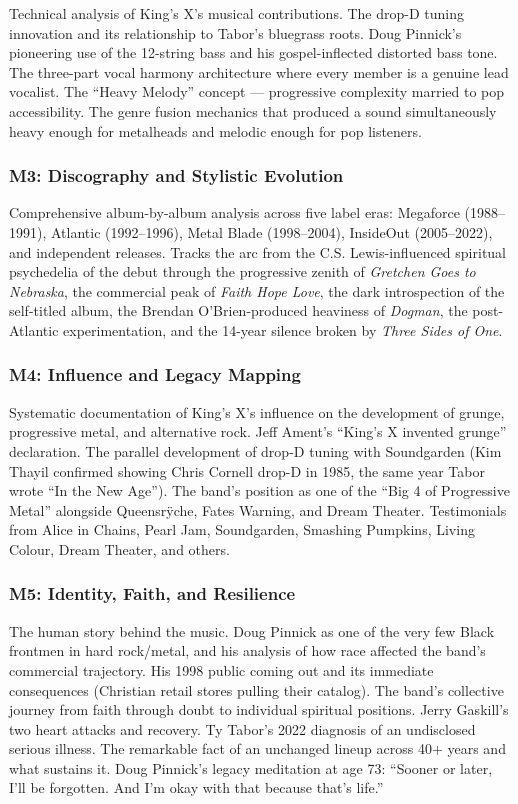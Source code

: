 \documentclass[11pt,letterpaper]{article}
\begin{document}
Technical analysis of King's X's musical contributions. The drop-D tuning innovation and its relationship to Tabor's bluegrass roots. Doug Pinnick's pioneering use of the 12-string bass and his gospel-inflected distorted bass tone. The three-part vocal harmony architecture where every member is a genuine lead vocalist. The ``Heavy Melody'' concept --- progressive complexity married to pop accessibility. The genre fusion mechanics that produced a sound simultaneously heavy enough for metalheads and melodic enough for pop listeners.

\subsubsection{M3: Discography and Stylistic Evolution}

Comprehensive album-by-album analysis across five label eras: Megaforce (1988--1991), Atlantic (1992--1996), Metal Blade (1998--2004), InsideOut (2005--2022), and independent releases. Tracks the arc from the C.S. Lewis-influenced spiritual psychedelia of the debut through the progressive zenith of \textit{Gretchen Goes to Nebraska}, the commercial peak of \textit{Faith Hope Love}, the dark introspection of the self-titled album, the Brendan O'Brien-produced heaviness of \textit{Dogman}, the post-Atlantic experimentation, and the 14-year silence broken by \textit{Three Sides of One}.

\subsubsection{M4: Influence and Legacy Mapping}

Systematic documentation of King's X's influence on the development of grunge, progressive metal, and alternative rock. Jeff Ament's ``King's X invented grunge'' declaration. The parallel development of drop-D tuning with Soundgarden (Kim Thayil confirmed showing Chris Cornell drop-D in 1985, the same year Tabor wrote ``In the New Age''). The band's position as one of the ``Big 4 of Progressive Metal'' alongside Queensr\"{y}che, Fates Warning, and Dream Theater. Testimonials from Alice in Chains, Pearl Jam, Soundgarden, Smashing Pumpkins, Living Colour, Dream Theater, and others.

\subsubsection{M5: Identity, Faith, and Resilience}

The human story behind the music. Doug Pinnick as one of the very few Black frontmen in hard rock/metal, and his analysis of how race affected the band's commercial trajectory. His 1998 public coming out and its immediate consequences (Christian retail stores pulling their catalog). The band's collective journey from faith through doubt to individual spiritual positions. Jerry Gaskill's two heart attacks and recovery. Ty Tabor's 2022 diagnosis of an undisclosed serious illness. The remarkable fact of an unchanged lineup across 40+ years and what sustains it. Doug Pinnick's legacy meditation at age 73: ``Sooner or later, I'll be forgotten. And I'm okay with that because that's life.''
\end{document}
